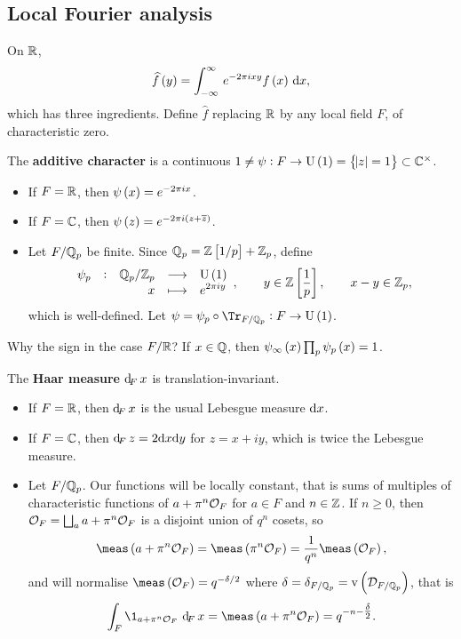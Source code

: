 \subsection{Local Fourier analysis}

On $ \mathbb{R} $,
$$ \widehat{f}\br{y} = \intd{-\infty}{\infty}{e^{-2\pi ixy}f\br{x}}{x}, $$
which has three ingredients. Define $ \widehat{f} $ replacing $ \mathbb{R} $ by any local field $ F $, of characteristic zero.

\begin{definition*}
The \textbf{additive character} is a continuous $ 1 \ne \psi : F \to \U\br{1} = \cbr{\abs{z} = 1} \subset \CC^\times $.
\begin{itemize}
\item If $ F = \mathbb{R} $, then $ \psi\br{x} = e^{-2\pi ix} $.
\item If $ F = \mathbb{C} $, then $ \psi\br{z} = e^{-2\pi i\br{z + \overline{z}}} $.
\item Let $ F / \mathbb{Q}_p $ be finite. Since $ \QQ_p = \ZZ\sbr{1 / p} + \ZZ_p $, define
$$ \function[\psi_p]{\QQ_p / \ZZ_p}{\U\br{1}}{x}{e^{2\pi iy}}, \qquad y \in \ZZ\sbr{\dfrac{1}{p}}, \qquad x - y \in \ZZ_p, $$
which is well-defined. Let $ \psi = \psi_p \circ \Tr_{F / \QQ_p} : F \to \U\br{1} $.
\end{itemize}
\end{definition*}

Why the sign in the case $ F / \mathbb{R} $? If $ x \in \mathbb{Q} $, then $ \psi_\infty\br{x}\prod_p \psi_p\br{x} = 1 $.


\begin{definition*}
The \textbf{Haar measure $ \dF x $} is translation-invariant.
\begin{itemize}
\item If $ F = \mathbb{R} $, then $ \dF x $ is the usual Lebesgue measure $ \mathrm{d} x $.
\item If $ F = \mathbb{C} $, then $ \dF z = 2\d x\d y $ for $ z = x + iy $, which is twice the Lebesgue measure.
\item Let $ F / \mathbb{Q}_p $. Our functions will be locally constant, that is sums of multiples of characteristic functions of $ a + \pi^n\mathcal{O}_F $ for $ a \in F $ and $ n \in \mathbb{Z} $. If $ n \ge 0 $, then $ \mathcal{O}_F = \bigsqcup_a a + \pi^n\mathcal{O}_F $ is a disjoint union of $ q^n $ cosets, so
$$ \meas\br{a + \pi^n\OOO_F} = \meas\br{\pi^n\OOO_F} = \dfrac{1}{q^n}\meas\br{\OOO_F}, $$
and will normalise $ \meas\br{\OOO_F} = q^{-\delta / 2} $ where $ \delta = \delta_{F / \QQ_p} = \v\br{\DDD_{F / \QQ_p}} $, that is
$$ \intF{\1_{a + \pi^n\OOO_F}}{x} = \meas\br{a + \pi^n\OOO_F} = q^{-n - \tfrac{\delta}{2}}. $$
\end{itemize}
\end{definition*}

